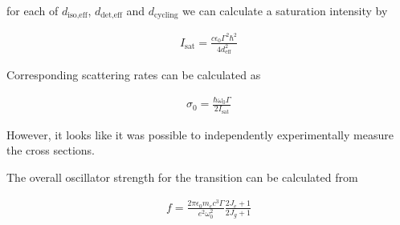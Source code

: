 \documentclass[12pt]{article}
\newcommand{\ep}{\epsilon}
\begin{document}
for each of $d_{\text{iso,eff}}$, $d_{\text{det,eff}}$ and $d_{\text{cycling}}$ we can calculate a saturation intensity by

\begin{align}
I_{\text{sat}} = \frac{c\ep_0 \Gamma^2 \hbar^2}{4 d_{\text{eff}}^2}
\end{align}

Corresponding scattering rates can be calculated as

\begin{align}
\sigma_0 = \frac{\hbar \omega_0 \Gamma}{2I_{\text{sat}}}
\end{align}

However, it looks like it was possible to independently experimentally measure the cross sections.

The overall oscillator strength for the transition can be calculated from

\begin{align}
f = \frac{2\pi \ep_0 m_e c^3 \Gamma}{e^2 \omega_0^2} \frac{2J_e + 1}{2J_g + 1}
\end{align}
\end{document}
